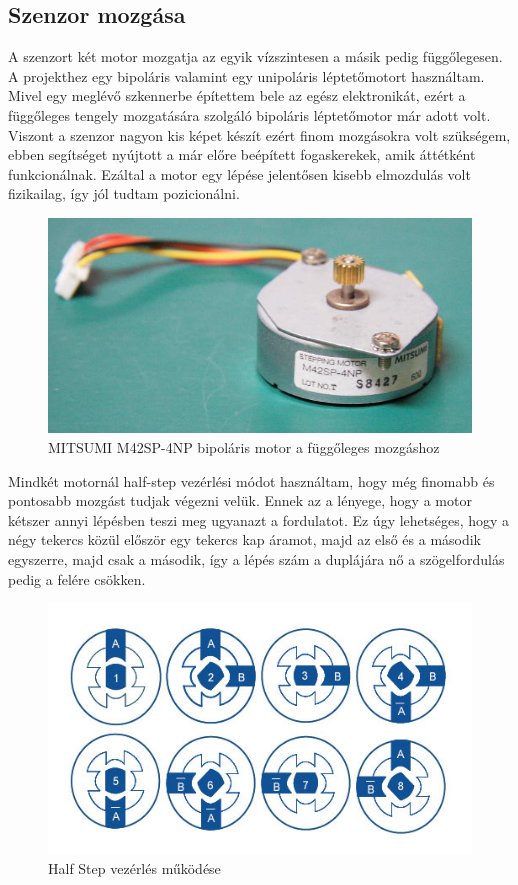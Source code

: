 \documentclass[]{thesis-ekf}
\theoremstyle{definition}
\theoremstyle{remark}
\begin{document}
\subsection{Szenzor mozgása}

A szenzort két motor mozgatja az egyik vízszintesen a másik pedig függőlegesen. A projekthez egy bipoláris valamint egy unipoláris léptetőmotort\cite{motorvezerlok} használtam. Mivel egy meglévő szkennerbe építettem bele az egész elektronikát, ezért a függőleges tengely mozgatására szolgáló bipoláris léptetőmotor már adott volt. Viszont a szenzor nagyon kis képet készít ezért finom mozgásokra volt szükségem, ebben segítséget nyújtott a már előre beépített fogaskerekek, amik áttétként funkcionálnak. Ezáltal a motor egy lépése jelentősen kisebb elmozdulás volt fizikailag, így jól tudtam pozicionálni. 
\begin{figure}[th!]
	\centering
	\includegraphics[width=0.4\linewidth]{MITSUMI-Stepping-Motor-M42SP-4NP}
	\caption[Mitsumi]{\footnotesize {MITSUMI M42SP-4NP bipoláris motor a függőleges mozgáshoz}}
	\label{fig:mitsumi-stepping-motor-m42sp-4np}
\end{figure}
\pagebreak

Mindkét motornál half-step vezérlési módot használtam, hogy még finomabb és pontosabb mozgást tudjak végezni velük. Ennek az a lényege, hogy a motor kétszer annyi lépésben teszi meg ugyanazt a fordulatot. Ez úgy lehetséges, hogy a négy tekercs közül először egy tekercs kap áramot, majd az első és a második egyszerre, majd csak a második, így a lépés szám a duplájára nő a szögelfordulás pedig a felére csökken.

\begin{figure}[th!]
	\centering
	\includegraphics[width=0.7\linewidth]{stepper-motors-half-step}
	\caption[Half Step vezérlés]{Half Step vezérlés működése}
	\label{fig:stepper-motors-half-step}
\end{figure}
\end{document}
